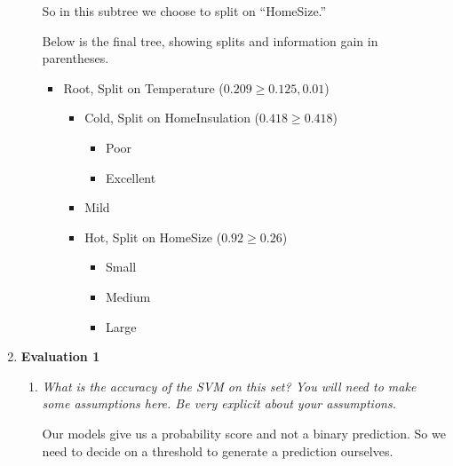 \documentclass{article}
\begin{document}
\begin{enumerate}
\begin{enumerate}
                So in this subtree we choose to split on ``HomeSize.''

                Below is the final tree, showing splits and information gain in
                parentheses.

                \begin{itemize}
                    \item Root, Split on Temperature ($0.209 \ge 0.125, 0.01$)
                        \begin{itemize}
                            \item Cold, Split on HomeInsulation ($0.418 \ge 0.418$)
                                \begin{itemize}
                                    \item Poor
                                    \item Excellent
                                \end{itemize}

                            \item Mild

                            \item Hot, Split on HomeSize ($0.92 \ge 0.26$)
                                \begin{itemize}
                                    \item Small
                                    \item Medium
                                    \item Large
                                \end{itemize}
                        \end{itemize}
                \end{itemize}
        \end{enumerate}

    \item \textbf{Evaluation 1}
        \begin{enumerate}
            \item \textit{What is the accuracy of the SVM on this set? You will
                need to make some assumptions here. Be very explicit about your
                assumptions.}

                Our models give us a probability score and not a binary
                prediction. So we need to decide on a threshold to generate a
                prediction ourselves.


\end{enumerate}
\end{enumerate}
\end{document}
